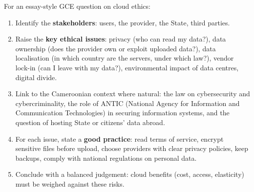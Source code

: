 \documentclass[11pt]{article}
\newcommand{\cle}[1]{{\popxbold\color{popdark}#1}}
\begin{document}
\begin{methode}
For an essay-style GCE question on cloud ethics:
\begin{enumerate}
\item Identify the \textbf{stakeholders}: users, the provider, the State, third parties.
\item Raise the \textbf{key ethical issues}: \cle{privacy} (who can read my data?), \cle{data ownership} (does the provider own or exploit uploaded data?), \cle{data localisation} (in which country are the servers, under which law?), \cle{vendor lock-in} (can I leave with my data?), environmental impact of data centres, digital divide.
\item Link to the Cameroonian context where natural: the law on cybersecurity and cybercriminality, the role of \cle{ANTIC} (National Agency for Information and Communication Technologies) in securing information systems, and the question of hosting State or citizens' data abroad.
\item For each issue, state a \textbf{good practice}: read terms of service, encrypt sensitive files before upload, choose providers with clear privacy policies, keep backups, comply with national regulations on personal data.
\item Conclude with a balanced judgement: cloud benefits (cost, access, elasticity) must be weighed against these risks.
\end{enumerate}
\end{methode}
\end{document}
